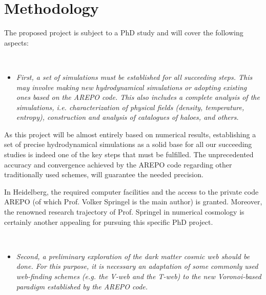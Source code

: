 \documentclass[a4,useAMS,usenatbib,usegraphicx,12pt]{article}
\begin{document}
\section{Methodology}


The proposed project is subject to a PhD study and will cover the following 
aspects:

\

\begin{itemize}

\item[\checkmark] \textit{First, a set of simulations must be established for 
all succeeding steps. This may involve making new hydrodynamical simulations or
adopting existing ones based on the AREPO code. This also includes a complete 
analysis of the simulations, i.e. characterization of physical fields (density,
temperature, entropy), construction and analysis of catalogues of haloes, and
others.}

\end{itemize}

As this project will be almost entirely based on numerical results, 
establishing a set of precise hydrodynamical simulations as a solid base for 
all our succeeding studies is indeed one of the key steps that must be 
fulfilled. The unprecedented accuracy and convergence achieved by the AREPO 
code regarding other traditionally used schemes, will guarantee the needed 
precision.


In Heidelberg, the required computer facilities and the access to the private 
code AREPO (of which Prof. Volker Springel is the main author) is granted. 
Moreover, the renowned research trajectory of Prof. Springel in numerical 
cosmology is certainly another appealing for pursuing this specific PhD 
project.

\

\begin{itemize}

\item[\checkmark] \textit{Second, a preliminary exploration of the dark matter
cosmic web should be done. For this purpose, it is necessary an adaptation of 
some commonly used web-finding schemes (e.g. the V-web and the T-web) to the 
new Voronoi-based paradigm established by the AREPO code.}

\end{itemize}
\end{document}
